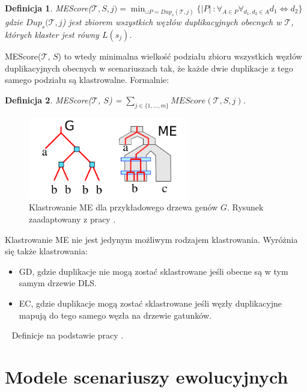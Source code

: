 \documentclass[licencjacka]{pracamgr}
\newtheorem{defi}{Definicja}[section]
\begin{document}
\begin{defi}\label{MEs}
  MEScore($\mathcal{T}, S, j) = \min_{\cup P = {Dup}_s(\mathcal{T},j)} \lbrace \vert P \vert\ : \forall_{A \in P} \forall_{d_1,d_2 \in A} d_1 \Longleftrightarrow d_2 \rbrace$
 gdzie ${Dup}_s(\mathcal{T},j$) jest zbiorem wszystkich węzłów duplikacyjnych obecnych w $\mathcal{T}$, których klaster jest równy $L(s_j)$. 
\end{defi}


MEScore($\mathcal{T}$, $S$) to wtedy minimalna wielkość podziału zbioru wszystkich węzłów duplikacyjnych obecnych w scenariuszach tak, że każde dwie duplikacje z tego samego podziału są klastrowalne. Formalnie:

\begin{defi}\label{ME}
  MEScore($\mathcal{T}$, $S$) = $\sum_{j \in \{1,\dots,m\}} MEScore(\mathcal{T}, S, j)$.
\end{defi}

\begin{figure}[H]
  \centering
  \includegraphics[width=70mm]{./pictures/clas_type_me.png}
  \caption{Klastrowanie ME dla przykładowego drzewa genów $G$. Rysunek zaadaptowany z pracy \cite{RME}.}
\end{figure}


Klastrowanie ME nie jest jedynym możliwym rodzajem klastrowania. Wyróżnia się także klastrowania:
\begin{itemize}
\item GD, gdzie duplikacje nie mogą zostać sklastrowane jeśli obecne są w tym samym drzewie DLS.
\item EC, gdzie duplikacje mogą zostać sklastrowane jeśli węzły duplikacyjne mapują do tego samego węzła na drzewie gatunków.
\end{itemize}
~\linebreak
Definicje na podstawie pracy \cite{RME}.

\section{Modele scenariuszy ewolucyjnych}
\end{document}
